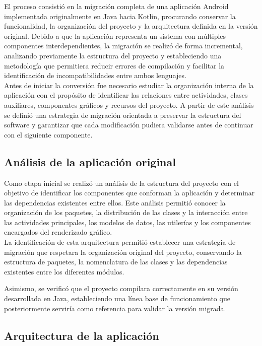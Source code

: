 \documentclass[conference]{IEEEtran}
\begin{document}
El proceso consistió en la migración completa de una aplicación Android implementada originalmente en Java hacia Kotlin, procurando conservar la funcionalidad, la organización del proyecto y la arquitectura definida en la versión original. Debido a que la aplicación representa un sistema con múltiples componentes interdependientes, la migración se realizó de forma incremental, analizando previamente la estructura del proyecto y estableciendo una metodología que permitiera reducir errores de compilación y facilitar la identificación de incompatibilidades entre ambos lenguajes.\\

Antes de iniciar la conversión fue necesario estudiar la organización interna de la aplicación con el propósito de identificar las relaciones entre actividades, clases auxiliares, componentes gráficos y recursos del proyecto. A partir de este análisis se definió una estrategia de migración orientada a preservar la estructura del software y garantizar que cada modificación pudiera validarse antes de continuar con el siguiente componente.\\

\subsection{Análisis de la aplicación original}

Como etapa inicial se realizó un análisis de la estructura del proyecto con el objetivo de identificar los componentes que conforman la aplicación y determinar las dependencias existentes entre ellos. Este análisis permitió conocer la organización de los paquetes, la distribución de las clases y la interacción entre las actividades principales, los modelos de datos, las utilerías y los componentes encargados del renderizado gráfico.\\

La identificación de esta arquitectura permitió establecer una estrategia de migración que respetara la organización original del proyecto, conservando la estructura de paquetes, la nomenclatura de las clases y las dependencias existentes entre los diferentes módulos.

Asimismo, se verificó que el proyecto compilara correctamente en su versión desarrollada en Java, estableciendo una línea base de funcionamiento que posteriormente serviría como referencia para validar la versión migrada.

\subsection{Arquitectura de la aplicación}
\end{document}
